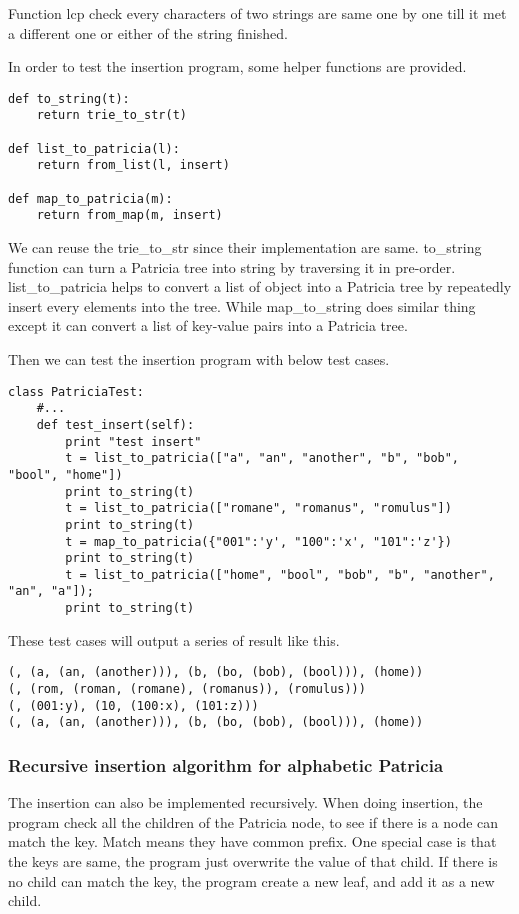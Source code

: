 \documentclass{article}
\begin{document}
Function lcp check every characters of two strings are same one by one 
till it met a different one or either of the string finished. 

In order to test the insertion program, some helper functions are
provided.

\begin{lstlisting}
def to_string(t):
    return trie_to_str(t)

def list_to_patricia(l):
    return from_list(l, insert)

def map_to_patricia(m):
    return from_map(m, insert)
\end{lstlisting}

We can reuse the trie\_to\_str since their implementation are same.
to\_string function can turn a Patricia tree into string by traversing it
in pre-order. list\_to\_patricia helps to convert a list of object into
a Patricia tree by repeatedly insert every elements into the tree. While 
map\_to\_string does similar thing except it can convert a list of key-value
pairs into a Patricia tree.

Then we can test the insertion program with below test cases.

\begin{lstlisting}
class PatriciaTest:
    #...
    def test_insert(self):
        print "test insert"
        t = list_to_patricia(["a", "an", "another", "b", "bob", "bool", "home"])
        print to_string(t)
        t = list_to_patricia(["romane", "romanus", "romulus"])
        print to_string(t)
        t = map_to_patricia({"001":'y', "100":'x', "101":'z'})
        print to_string(t)
        t = list_to_patricia(["home", "bool", "bob", "b", "another", "an", "a"]);
        print to_string(t)
\end{lstlisting}

These test cases will output a series of result like this.

\begin{verbatim}
(, (a, (an, (another))), (b, (bo, (bob), (bool))), (home))
(, (rom, (roman, (romane), (romanus)), (romulus)))
(, (001:y), (10, (100:x), (101:z)))
(, (a, (an, (another))), (b, (bo, (bob), (bool))), (home))
\end{verbatim}

\subsubsection{Recursive insertion algorithm for alphabetic Patricia}

The insertion can also be implemented recursively. When doing
insertion, the program check all the children of the Patricia node, to
see if there is a node can match the key. Match means they have common
prefix. One special case is that the keys are same, the program just
overwrite the value of that child. If there is no child can match the
key, the program create a new leaf, and add it as a new child.
\end{document}
